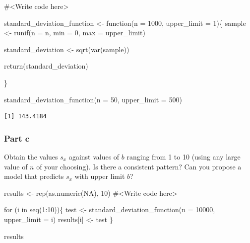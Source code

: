 \documentclass[
  letterpaper,
  DIV=11,
  numbers=noendperiod]{scrartcl}
\newenvironment{Shaded}{\begin{snugshade}}{\end{snugshade}}
\newcommand{\AttributeTok}[1]{\textcolor[rgb]{0.40,0.45,0.13}{#1}}
\newcommand{\CommentTok}[1]{\textcolor[rgb]{0.37,0.37,0.37}{#1}}
\newcommand{\ConstantTok}[1]{\textcolor[rgb]{0.56,0.35,0.01}{#1}}
\newcommand{\ControlFlowTok}[1]{\textcolor[rgb]{0.00,0.23,0.31}{#1}}
\newcommand{\DecValTok}[1]{\textcolor[rgb]{0.68,0.00,0.00}{#1}}
\newcommand{\FunctionTok}[1]{\textcolor[rgb]{0.28,0.35,0.67}{#1}}
\newcommand{\NormalTok}[1]{\textcolor[rgb]{0.00,0.23,0.31}{#1}}
\newcommand{\OtherTok}[1]{\textcolor[rgb]{0.00,0.23,0.31}{#1}}
\newcommand{\SpecialCharTok}[1]{\textcolor[rgb]{0.37,0.37,0.37}{#1}}
\begin{document}
\begin{Shaded}
\begin{Highlighting}[]
\CommentTok{\#\textless{}Write code here\textgreater{}}

\NormalTok{standard\_deviation\_function }\OtherTok{\textless{}{-}} \ControlFlowTok{function}\NormalTok{(}\AttributeTok{n =} \DecValTok{1000}\NormalTok{, }\AttributeTok{upper\_limit =} \DecValTok{1}\NormalTok{)\{}
\NormalTok{  sample }\OtherTok{\textless{}{-}} \FunctionTok{runif}\NormalTok{(}\AttributeTok{n =}\NormalTok{ n, }
                    \AttributeTok{min =} \DecValTok{0}\NormalTok{, }
                    \AttributeTok{max =}\NormalTok{ upper\_limit)}

\NormalTok{standard\_deviation }\OtherTok{\textless{}{-}} \FunctionTok{sqrt}\NormalTok{(}\FunctionTok{var}\NormalTok{(sample))}

\FunctionTok{return}\NormalTok{(standard\_deviation)}
  
\NormalTok{\}}


\FunctionTok{standard\_deviation\_function}\NormalTok{(}\AttributeTok{n =} \DecValTok{50}\NormalTok{, }\AttributeTok{upper\_limit =} \DecValTok{500}\NormalTok{)}
\end{Highlighting}
\end{Shaded}

\begin{verbatim}
[1] 143.4184
\end{verbatim}

\hypertarget{part-c-1}{%
\subsubsection{Part c}\label{part-c-1}}

Obtain the values \(s_{x}\) against values of \(b\) ranging from 1 to 10
(using any large value of \(n\) of your choosing). Is there a consistent
pattern? Can you propose a model that predicts \(s_{x}\) with upper
limit \(b\)?

\begin{Shaded}
\begin{Highlighting}[]
\NormalTok{results }\OtherTok{\textless{}{-}} \FunctionTok{rep}\NormalTok{(}\FunctionTok{as.numeric}\NormalTok{(}\ConstantTok{NA}\NormalTok{), }\DecValTok{10}\NormalTok{)}
\CommentTok{\#\textless{}Write code here\textgreater{}}

\ControlFlowTok{for}\NormalTok{ (i }\ControlFlowTok{in} \FunctionTok{seq}\NormalTok{(}\DecValTok{1}\SpecialCharTok{:}\DecValTok{10}\NormalTok{))\{}
\NormalTok{  test }\OtherTok{\textless{}{-}} \FunctionTok{standard\_deviation\_function}\NormalTok{(}\AttributeTok{n =} \DecValTok{10000}\NormalTok{, }\AttributeTok{upper\_limit =}\NormalTok{ i)}
\NormalTok{  results[i] }\OtherTok{\textless{}{-}}\NormalTok{ test}
\NormalTok{\}}

\NormalTok{results}
\end{Highlighting}
\end{Shaded}
\end{document}
